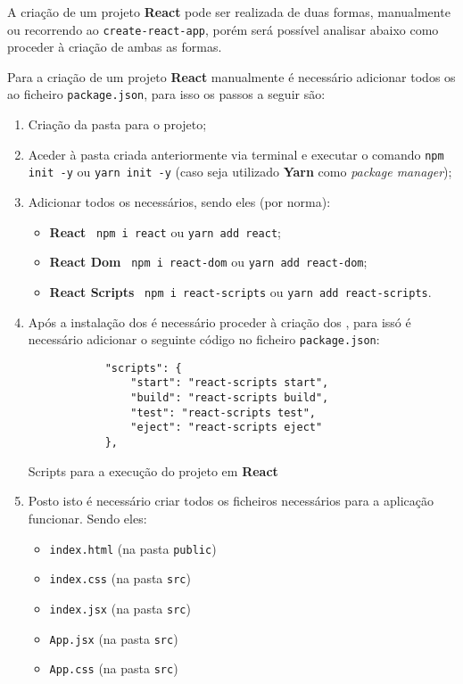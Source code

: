
A criação de um projeto \textbf{React} pode ser realizada de duas formas, manualmente ou recorrendo ao \texttt{create-react-app}, porém será possível analisar abaixo como proceder à criação de ambas as formas.

Para a criação de um projeto \textbf{React} manualmente é necessário adicionar todos os \textit{} ao ficheiro \texttt{package.json}, para isso os passos a seguir são:

\begin{enumerate}
	\item Criação da pasta para o projeto;
	\item Aceder à pasta criada anteriormente via terminal e executar o comando \texttt{npm init -y} ou \texttt{yarn init -y} {\scriptsize (caso seja utilizado \textbf{Yarn} como \textit{package manager})};
	\item Adicionar todos os \textit{} necessários, sendo eles {\scriptsize (por norma)}:
	\begin{itemize}
		\item \textbf{React} \textemdash~\texttt{npm i react} ou \texttt{yarn add react};
		\item \textbf{React Dom} \textemdash~\texttt{npm i react-dom} ou \texttt{yarn add react-dom};
		\item \textbf{React Scripts} \textemdash~\texttt{npm i react-scripts} ou \texttt{yarn add react-scripts}.
	\end{itemize}
	\item Após a instalação dos \textit{} é necessário proceder à criação dos \textit{}, para issó é necessário adicionar o seguinte código no ficheiro \texttt{package.json}:

	\begin{longlisting}
		\begin{verbatim}
			"scripts": {
				"start": "react-scripts start",
				"build": "react-scripts build",
				"test": "react-scripts test",
				"eject": "react-scripts eject"
			},
		\end{verbatim}
		\caption{Scripts para a execução do projeto em \textbf{React}}
	\end{longlisting}

	\item Posto isto é necessário criar todos os ficheiros necessários para a aplicação funcionar. Sendo eles:
	\begin{itemize}
		\item \texttt{index.html} {\scriptsize (na pasta \texttt{public})}
		\item \texttt{index.css} {\scriptsize (na pasta \texttt{src})}
		\item \texttt{index.jsx} {\scriptsize (na pasta \texttt{src})}
		\item \texttt{App.jsx} {\scriptsize (na pasta \texttt{src})}
		\item \texttt{App.css} {\scriptsize (na pasta \texttt{src})}
	\end{itemize}


\end{enumerate}
